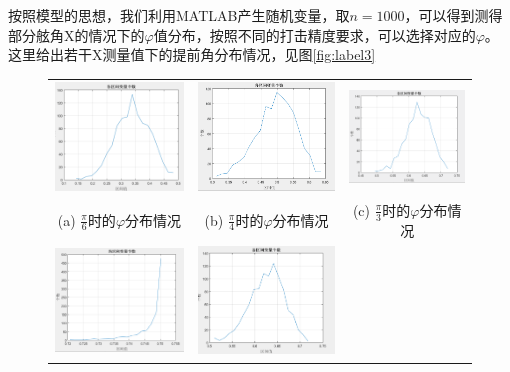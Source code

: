 \documentclass[12pt]{article}%
\begin{document}
按照模型的思想，我们利用MATLAB产生随机变量，取$n=1000$，可以得到测得部分舷角X的情况下的$\varphi$值分布，按照不同的打击精度要求，可以选择对应的$\varphi$。
这里给出若干X测量值下的提前角分布情况，见图\ref{fig:label3}
\begin{figure}
	\centering{}
	\begin{tabular}{ccc}
		\includegraphics[width=0.33\linewidth]{TIM20180528014501.png}  & 
		\includegraphics[width=0.33\linewidth]{TIM20180528035003.png}  &
		\includegraphics[width=0.33\linewidth]{TIM20180528035052.png} \\
		(a) $\frac{\pi}{6}$时的$\varphi$分布情况 & (b) $\frac{\pi}{4}$时的$\varphi$分布情况&(c) $\frac{\pi}{3}$时的$\varphi$分布情况\\
		\includegraphics[width=0.33\linewidth]{TIM20180528035131.png}  & 
		\includegraphics[width=0.33\linewidth]{TIM20180528035205.png}  &

\end{tabular}
\end{figure}
\end{document}
